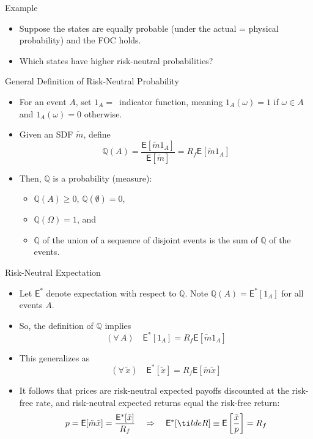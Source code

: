 \documentclass[10pt]{beamer}
\newcommand{\bi}{\begin{itemize}}
\newcommand{\ei}{\end{itemize}}
\newcommand{\im}{\item}
\newcommand{\mye}{\ensuremath{\mathsf{E}}}
\newcommand{\tx}{\tilde{x}}
\newcommand{\tm}{\tilde{m}}
\newcommand{\qr}{\mathbb{Q}}
\begin{document}
\begin{frame}{Example}
    \bi 
    \im Suppose the states are equally probable (under the actual = physical probability) and the FOC holds. 
    \im Which states have higher risk-neutral probabilities?
    \ei
\end{frame}


\begin{frame}{General Definition of Risk-Neutral Probability}
\bi 
\im For an event $A$, set $1_A=\,$ indicator function, meaning $1_A(\omega) = 1$ if $\omega \in A$ and $1_A(\omega) = 0$ otherwise.
\im Given an SDF $\tm$, define 
$$\qr(A) = \frac{ \mye[\tilde{m}1_A]}{\mye[\tm]} = R_f \mye[\tilde{m}1_A]$$
\im Then, $\qr$ is a probability (measure): 
\bi 
\im $\qr(A) \geq 0$, $\qr(\emptyset)=0$, 
\im $\qr(\Omega)=1$, and 
\im $\qr$ of the union of a sequence of disjoint events is the sum of $\qr$ of the events. 
\ei
\ei 
\end{frame}

\begin{frame}{Risk-Neutral Expectation}
    \bi 
\im Let $\mye^*$ denote expectation with respect to $\qr$.  Note $\qr(A) = \mye^*[1_A]$ for all events $A$.  
\im So, the definition of $\qr$ implies
$$(\forall\, A) \quad \mye^*[1_A] = R_f \mye[\tm 1_A]$$

\im This generalizes as
$$(\forall\, \tx) \quad \mye^*[\tx] = R_f \mye[\tm \tx]$$


\im It follows that prices are risk-neutral expected payoffs discounted at the risk-free rate, and risk-neutral expected returns equal the risk-free return: 
$$p = \mye[\tm\tx] = \frac{\mye^*[\tx]}{R_f} \quad \Rightarrow \quad \mye^*[\ti lde{R}] \equiv \mye\left[\frac{\tx}{p}\right] = R_f$$
\ei
\end{frame}
\end{document}
